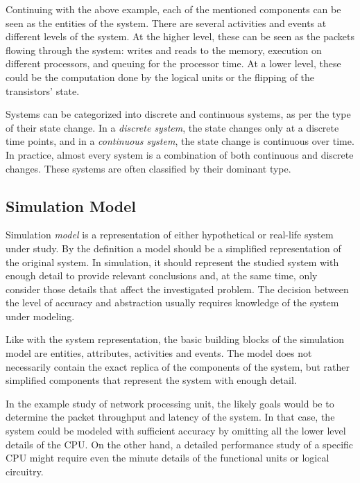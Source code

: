 Continuing with the above example, each of the mentioned components can be seen as the entities of the system. There are several activities and events at different levels of the system. At the higher level, these can be seen as the packets flowing through the system: writes and reads to the memory, execution on different processors, and queuing for the processor time. At a lower level, these could be the computation done by the logical units or the flipping of the transistors' state.

Systems can be categorized into discrete and continuous systems, as per the type of their state change. In a \emph{discrete system}, the state changes only at a discrete time points, and in a \emph{continuous system}, the state change is continuous over time. In practice, almost every system is a combination of both continuous and discrete changes. These systems are often classified by their dominant type.~\cite{Banks:2010:DES}

\subsection{Simulation Model}
\label{sec:simulation-model}

Simulation \emph{model} is a representation of either hypothetical or real-life system under study. By the definition a model should be a simplified representation of the original system. In simulation, it should represent the studied system with enough detail to provide relevant conclusions and, at the same time, only consider those details that affect the investigated problem. The decision between the level of accuracy and abstraction usually requires knowledge of the system under modeling.~\cite{Banks:2010:DES}

Like with the system representation, the basic building blocks of the simulation model are entities, attributes, activities and events. The model does not necessarily contain the exact replica of the components of the system, but rather simplified components that represent the system with enough detail.~\cite{Banks:2010:DES}

In the example study of network processing unit, the likely goals would be to determine the packet throughput and latency of the system. In that case, the system could be modeled with sufficient accuracy by omitting all the lower level details of the CPU. On the other hand, a detailed performance study of a specific CPU might require even the minute details of the functional units or logical circuitry.~\cite{Magnusson:2002:Simics, Hughes:2002:Rsim}

